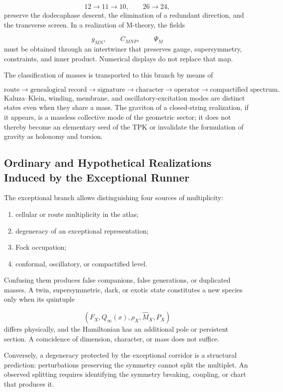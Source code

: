 \[
12\longrightarrow11\longrightarrow10,
\qquad
26\longrightarrow24,
\]
preserve the dodecaphase descent, the elimination of a redundant direction, and the transverse screen. In a realization of M-theory, the fields

\[
g_{MN},\qquad C_{MNP},\qquad\Psi_M
\]
must be obtained through an intertwiner that preserves gauge, supersymmetry, constraints, and inner product. Numerical displays do not replace that map.

The classification of masses is transported to this branch by means of

\[
\text{route}
\longrightarrow\text{genealogical record}
\longrightarrow\text{signature}
\longrightarrow\text{character}
\longrightarrow\text{operator}
\longrightarrow\text{compactified spectrum}.
\]
Kaluza--Klein, winding, membrane, and oscillatory-excitation modes are distinct states even when they share a mass. The graviton of a closed-string realization, if it appears, is a massless collective mode of the geometric sector; it does not thereby become an elementary seed of the TPK or invalidate the formulation of gravity as holonomy and torsion.

\subsection{Ordinary and Hypothetical Realizations Induced by the Exceptional Runner}
The exceptional branch allows distinguishing four sources of multiplicity:

\begin{enumerate}
\item cellular or route multiplicity in the atlas;
\item degeneracy of an exceptional representation;
\item Fock occupation;
\item conformal, oscillatory, or compactified level.
\end{enumerate}
Confusing them produces false companions, false generations, or duplicated masses. A twin, supersymmetric, dark, or exotic state constitutes a new species only when its quintuple

\[
(F_X,Q_\infty(x),\rho_X,\widehat M_X,P_X)
\]
differs physically, and the Hamiltonian has an additional pole or persistent section. A coincidence of dimension, character, or mass does not suffice.

Conversely, a degeneracy protected by the exceptional corridor is a structural prediction: perturbations preserving the symmetry cannot split the multiplet. An observed splitting requires identifying the symmetry breaking, coupling, or chart that produces it.

